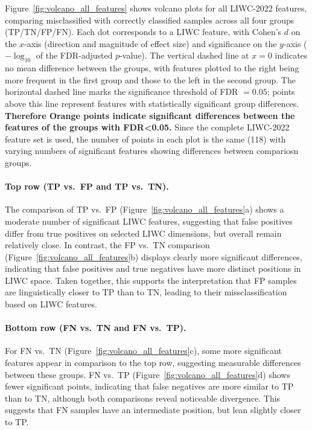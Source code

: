 Figure~\ref{fig:volcano_all_features} shows volcano plots for all LIWC-2022 features, comparing misclassified with correctly classified samples across all four groups (TP/TN/FP/FN). 
Each dot corresponds to a LIWC feature, with Cohen’s $d$ \cite{cohen1988} on the $x$-axis (direction and magnitude of effect size) and significance on the $y$-axis ($-\log_{10}$ of the FDR-adjusted $p$-value). The vertical dashed line at $x=0$ indicates no mean  difference between the groups, with features plotted to the right being more frequent in the first group and those to the left in the second group. 
The horizontal dashed line marks the significance threshold of FDR $=0.05$; points above this line represent features with statistically significant group differences. \textbf{Therefore Orange points indicate significant differences between the features of the groups with FDR<0.05.} Since the complete LIWC-2022 feature set is used, the number of points in each plot is the same (118) with varying numbers of significant features showing differences between compariosn groups.

\paragraph{Top row (TP vs.\ FP and TP vs.\ TN).}
The comparison of TP vs.\ FP (Figure~\ref{fig:volcano_all_features}a) shows a moderate number of significant LIWC features,  suggesting that false positives differ from true positives on selected LIWC dimensions, but overall remain relatively close. 
In contrast, the FP vs.\ TN comparison (Figure~\ref{fig:volcano_all_features}b) displays clearly more significant differences, indicating that false positives and true negatives have more distinct positions in LIWC space. 
Taken together, this supports the interpretation that FP samples are linguistically closer to TP than to TN, leading to their missclassification based on LIWC features.

\paragraph{Bottom row (FN vs.\ TN and FN vs.\ TP).}
For FN vs.\ TN (Figure~\ref{fig:volcano_all_features}c), some more significant features appear in comparison to the top row, suggesting measurable differences between these groups. 
FN vs.\ TP (Figure~\ref{fig:volcano_all_features}d) shows fewer significant points, indicating that false negatives are more similar to TP than to TN, although both comparisons reveal noticeable divergence. This suggests that FN samples have an intermediate position, but lean slightly closer to TP.

